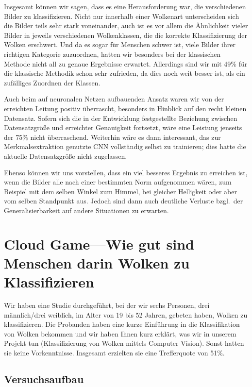 \documentclass[a4,german]{article}
\begin{document}
Insgesamt können wir sagen, dass es eine Herausforderung war, die verschiedenen Bilder zu klassifizieren.
Nicht nur innerhalb einer Wolkenart unterscheiden sich die Bilder teils sehr stark voneinander, auch ist es vor allem die Ähnlichkeit vieler Bilder in jeweils verschiedenen Wolkenklassen, die die korrekte Klassifizierung der Wolken erschwert.
Und da es sogar für Menschen schwer ist, viele Bilder ihrer richtigen Kategorie zuzuordnen, hatten wir besonders bei der klassischen Methode nicht all zu genaue Ergebnisse erwartet.
Allerdings sind wir mit 49\% für die klassische Methodik schon sehr zufrieden, da dies noch weit besser ist, als ein zufälliges Zuordnen der Klassen.

Auch beim auf neuronalen Netzen aufbauenden Ansatz waren wir von der erreichten Leitung positiv überrascht, besonders in Hinblick auf den recht kleinen Datensatz.
Sofern sich die in der Entwicklung festgestellte Beziehung zwischen Datensatzgröße und erreichter Genauigkeit fortsetzt, wäre eine Leistung jenseits der 75\% nicht überraschend.
Weiterhin wäre es dann interessant, das zur Merkmalsextraktion genutzte CNN vollständig selbst zu trainieren; dies hatte die aktuelle Datensatzgröße nicht zugelassen.

Ebenso können wir uns vorstellen, dass ein viel besseres Ergebnis zu erreichen ist, wenn die Bilder alle nach einer bestimmten Norm aufgenommen wären, zum Beispiel mit dem selben Winkel zum Himmel, bei gleicher Helligkeit oder aber vom selben Standpunkt aus.
Jedoch sind dann auch deutliche Verluste bzgl.\ der Generalisierbarkeit auf andere Situationen zu erwarten.





\pagebreak
\appendix
\section{Cloud Game---Wie gut sind Menschen darin Wolken zu Klassifizieren}

Wir haben eine Studie durchgeführt, bei der wir sechs Personen, drei männlich/drei weiblich, im Alter von 19 bis 52 Jahren, gebeten haben, Wolken zu klassifizieren.
Die Probanden haben eine kurze Einführung in die Klassifikation von Wolken bekommen und wir haben Ihnen kurz erklärt, was wir in unserem Projekt tun (Klassifizierung von Wolken mittels Computer Vision).
Sonst hatten sie keine Vorkenntnisse.
Insgesamt erzielten sie eine Trefferquote von 51\%.


\subsection{Versuchsaufbau}
\label{anhang:cloudgame}
\end{document}

